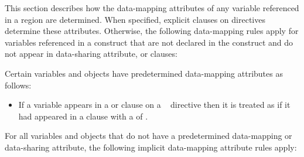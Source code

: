 This section describes how the data-mapping attributes of any variable
referenced in a  region are determined. When specified,
explicit  clauses on 
directives determine these attributes.  Otherwise, the following
data-mapping rules apply for variables referenced in a 
construct that are not declared in the construct and do not appear in
data-sharing attribute,  or  clauses:

Certain variables and objects have predetermined data-mapping attributes
as follows:

\begin{itemize}
\item If a variable appears in a  or  clause
on a ~ directive then it is treated as if it had appeared in a  clause with a  of .


\end{itemize}

For all variables and objects that do not have a predetermined data-mapping or
data-sharing attribute, the following implicit data-mapping attribute rules
apply:

